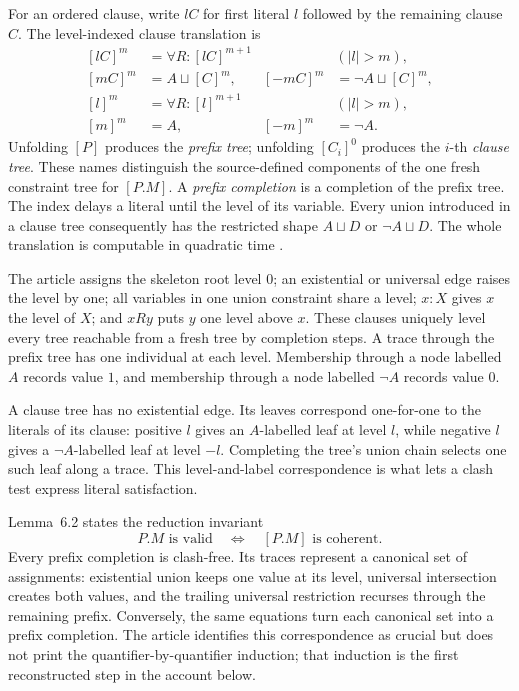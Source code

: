 For an ordered clause, write \(lC\) for first literal \(l\) followed by the
remaining clause \(C\).  The level-indexed clause translation is
\[
\begin{aligned}
 [lC]^m&=\forall R:[lC]^{m+1}&&(|l|>m),\\
 [mC]^m&=A\sqcup[C]^m,&
 [-mC]^m&=\neg A\sqcup[C]^m,\\
 [l]^m&=\forall R:[l]^{m+1}&&(|l|>m),\\
 [m]^m&=A,&[-m]^m&=\neg A.
\end{aligned}
\]
Unfolding \([P]\) produces the \emph{prefix tree}; unfolding
\([C_i]^0\) produces the \(i\)-th \emph{clause tree}.  These names distinguish
the source-defined components of the one fresh constraint tree for
\([P.M]\).  A \emph{prefix completion} is a completion of the prefix tree.
The index delays a literal until the level of its variable.  Every union
introduced in a clause tree consequently has the restricted shape
\(A\sqcup D\) or \(\neg A\sqcup D\).  The whole translation is computable in
quadratic time
\cite[\S6.2, pp.~19--21]{SchmidtSchaussSmolka1991}.

The article assigns the skeleton root level \(0\); an existential or universal
edge raises the level by one; all variables in one union constraint share a
level; \(x:X\) gives \(x\) the level of \(X\); and \(xRy\) puts \(y\) one level
above \(x\).  These clauses uniquely level every tree reachable from a fresh
tree by completion steps.  A trace through the prefix tree has one individual
at each level.  Membership through a node labelled \(A\) records value \(1\),
and membership through a node labelled \(\neg A\) records value \(0\).

A clause tree has no existential edge.  Its leaves correspond one-for-one to
the literals of its clause: positive \(l\) gives an \(A\)-labelled leaf at
level \(l\), while negative \(l\) gives a \(\neg A\)-labelled leaf at level
\(-l\).  Completing the tree's union chain selects one such leaf along a
trace.  This level-and-label correspondence is what lets a clash test express
literal satisfaction.

Lemma~6.2 states the reduction invariant
\[
 \boxed{
 P.M\text{ is valid}
 \quad\Longleftrightarrow\quad
 [P.M]\text{ is coherent}.}
\]
Every prefix completion is clash-free.  Its traces represent a canonical set
of assignments: existential union keeps one value at its level, universal
intersection creates both values, and the trailing universal restriction
recurses through the remaining prefix.  Conversely, the same equations turn
each canonical set into a prefix completion.  The article identifies this
correspondence as crucial but does not print the quantifier-by-quantifier
induction; that induction is the first reconstructed step in the account
below.

